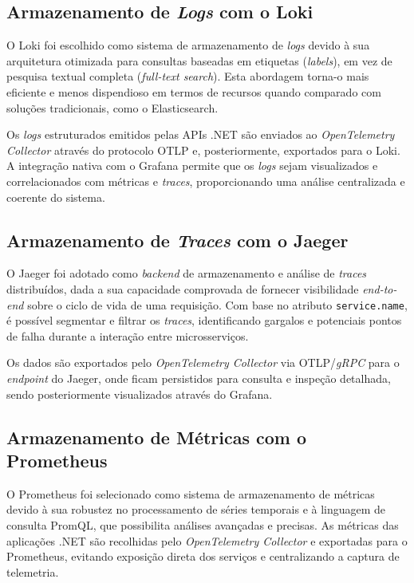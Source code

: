 \subsection{Armazenamento de \textit{Logs} com o Loki}
O Loki foi escolhido como sistema de armazenamento de \textit{logs} devido à sua arquitetura otimizada para consultas baseadas em etiquetas (\textit{labels}), em vez de pesquisa textual completa (\textit{full-text search}). Esta abordagem torna-o mais eficiente e menos dispendioso em termos de recursos quando comparado com soluções tradicionais, como o Elasticsearch. 

Os \textit{logs} estruturados emitidos pelas APIs .NET são enviados ao \textit{OpenTelemetry Collector} através do protocolo OTLP e, posteriormente, exportados para o Loki. A integração nativa com o Grafana permite que os \textit{logs} sejam visualizados e correlacionados com métricas e \textit{traces}, proporcionando uma análise centralizada e coerente do sistema.

\subsection{Armazenamento de \textit{Traces} com o Jaeger}
O Jaeger foi adotado como \textit{backend} de armazenamento e análise de \textit{traces} distribuídos, dada a sua capacidade comprovada de fornecer visibilidade \textit{end-to-end} sobre o ciclo de vida de uma requisição. Com base no atributo \texttt{service.name}, é possível segmentar e filtrar os \textit{traces}, identificando gargalos e potenciais pontos de falha durante a interação entre microsserviços.

Os dados são exportados pelo \textit{OpenTelemetry Collector} via OTLP/\textit{gRPC} para o \textit{endpoint} do Jaeger, onde ficam persistidos para consulta e inspeção detalhada, sendo posteriormente visualizados através do Grafana.

\subsection{Armazenamento de Métricas com o Prometheus}
O Prometheus foi selecionado como sistema de armazenamento de métricas devido à sua robustez no processamento de séries temporais e à linguagem de consulta PromQL, que possibilita análises avançadas e precisas. As métricas das aplicações .NET são recolhidas pelo \textit{OpenTelemetry Collector} e exportadas para o Prometheus, evitando exposição direta dos serviços e centralizando a captura de telemetria.

